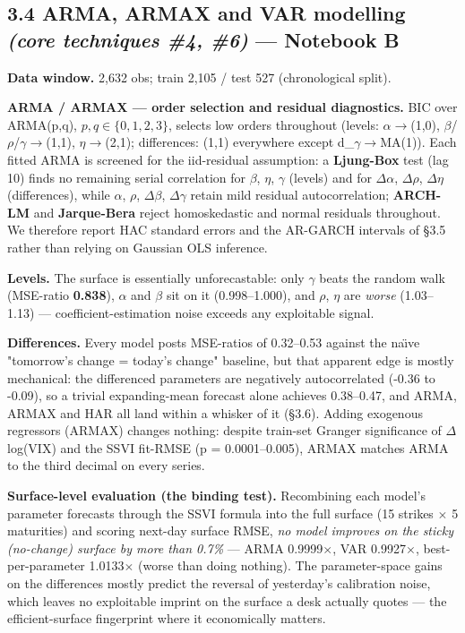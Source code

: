 \documentclass[10pt,a4paper]{article}
\begin{document}
\subsection*{3.4 ARMA, ARMAX and VAR modelling \textit{(core techniques \#4, \#6)} --- Notebook B}

\textbf{Data window.} 2,632 obs; train 2,105 / test 527 (chronological split).

\textbf{ARMA / ARMAX --- order selection and residual diagnostics.} BIC over ARMA(p,q), $p,q\in\{0,1,2,3\}$, selects low orders throughout (levels: $\alpha$$\rightarrow$(1,0), $\beta$/$\rho$/$\gamma$$\rightarrow$(1,1), $\eta$$\rightarrow$(2,1); differences: (1,1) everywhere except d\_$\gamma$$\rightarrow$MA(1)). Each fitted ARMA is screened for the iid-residual assumption: a \textbf{Ljung-Box} test (lag 10) finds no remaining serial correlation for $\beta$, $\eta$, $\gamma$ (levels) and for $\Delta$$\alpha$, $\Delta$$\rho$, $\Delta$$\eta$ (differences), while $\alpha$, $\rho$, $\Delta$$\beta$, $\Delta$$\gamma$ retain mild residual autocorrelation; \textbf{ARCH-LM} and \textbf{Jarque-Bera} reject homoskedastic and normal residuals throughout. We therefore report HAC standard errors and the AR-GARCH intervals of \S{}3.5 rather than relying on Gaussian OLS inference.

\textbf{Levels.} The surface is essentially unforecastable: only $\gamma$ beats the random walk (MSE-ratio \textbf{0.838}), $\alpha$ and $\beta$ sit on it (0.998--1.000), and $\rho$, $\eta$ are \textit{worse} (1.03--1.13) --- coefficient-estimation noise exceeds any exploitable signal.

\textbf{Differences.} Every model posts MSE-ratios of 0.32--0.53 against the na\"{\i}ve "tomorrow's change = today's change" baseline, but that apparent edge is mostly mechanical: the differenced parameters are negatively autocorrelated (-0.36 to -0.09), so a trivial expanding-mean forecast alone achieves 0.38--0.47, and ARMA, ARMAX and HAR all land within a whisker of it (\S{}3.6). Adding exogenous regressors (ARMAX) changes nothing: despite train-set Granger significance of $\Delta$log(VIX) and the SSVI fit-RMSE (p = 0.0001--0.005), ARMAX matches ARMA to the third decimal on every series.

\textbf{Surface-level evaluation (the binding test).} Recombining each model's parameter forecasts through the SSVI formula into the full surface (15 strikes $\times$ 5 maturities) and scoring next-day surface RMSE, \textit{no model improves on the sticky (no-change) surface by more than 0.7\%} --- ARMA 0.9999$\times$, VAR 0.9927$\times$, best-per-parameter 1.0133$\times$ (worse than doing nothing). The parameter-space gains on the differences mostly predict the reversal of yesterday's calibration noise, which leaves no exploitable imprint on the surface a desk actually quotes --- the efficient-surface fingerprint where it economically matters.
\end{document}
